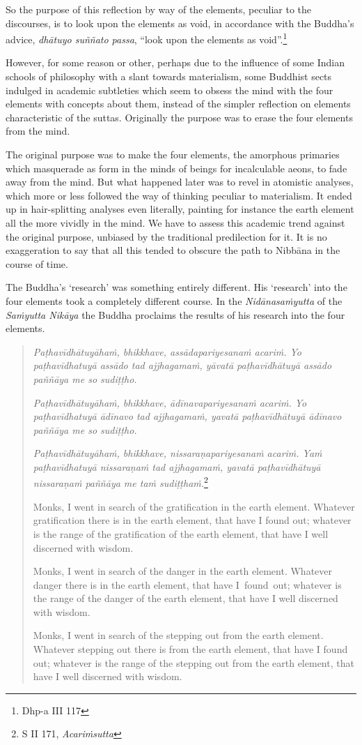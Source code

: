 So the purpose of this reflection by way of the elements, peculiar to the discourses, is to look upon the elements as void, in accordance with the Buddha's advice, \emph{dhātuyo suññato passa}, ``look upon the elements as void''.\footnote{Dhp-a III 117}

However, for some reason or other, perhaps due to the influence of some Indian schools of philosophy with a slant towards materialism, some Buddhist sects indulged in academic subtleties which seem to obsess the mind with the four elements with concepts about them, instead of the simpler reflection on elements characteristic of the suttas. Originally the purpose was to erase the four elements from the mind.

The original purpose was to make the four elements, the amorphous primaries which masquerade as form in the minds of beings for incalculable aeons, to fade away from the mind. But what happened later was to revel in atomistic analyses, which more or less followed the way of thinking peculiar to materialism. It ended up in hair-splitting analyses even literally, painting for instance the earth element all the more vividly in the mind. We have to assess this academic trend against the original purpose, unbiased by the traditional predilection for it. It is no exaggeration to say that all this tended to obscure the path to Nibbāna in the course of time.

The Buddha's `research' was something entirely different. His `research' into the four elements took a completely different course. In the \emph{Nidānasaṁyutta} of the \emph{Saṁyutta Nikāya} the Buddha proclaims the results of his research into the four elements.

\begin{quote}
\emph{Paṭhavīdhātuyāhaṁ, bhikkhave, assādapariyesanaṁ acariṁ. Yo paṭhavīdhatuyā assādo tad ajjhagamaṁ, yāvatā paṭhavīdhātuyā assādo paññāya me so sudiṭṭho.}

\emph{Paṭhavīdhātuyāhaṁ, bhikkhave, ādīnavapariyesanaṁ acariṁ. Yo paṭhavīdhatuyā ādīnavo tad ajjhagamaṁ, yavatā paṭhavīdhātuyā ādīnavo paññāya me so sudiṭṭho.}

\emph{Paṭhavīdhātuyāhaṁ, bhikkhave, nissaraṇapariyesanaṁ acariṁ. Yaṁ paṭhavīdhatuyā nissaraṇaṁ tad ajjhagamaṁ, yavatā paṭhavīdhātuyā nissaraṇaṁ paññāya me taṁ sudiṭṭhaṁ.}\footnote{S II 171, \emph{Acariṁsutta}}

Monks, I went in search of the gratification in the earth element. Whatever gratification there is in the earth element, that have I found out; whatever is the range of the gratification of the earth element, that have I well discerned with wisdom.

Monks, I went in search of the danger in the earth element. Whatever danger there is in the earth element, that have I~found~out; whatever is the range of the danger of the earth element, that have I well discerned with wisdom.

Monks, I went in search of the stepping out from the earth element. Whatever stepping out there is from the earth element, that have I found out; whatever is the range of the stepping out from the earth element, that have I well discerned with wisdom.
\end{quote}

